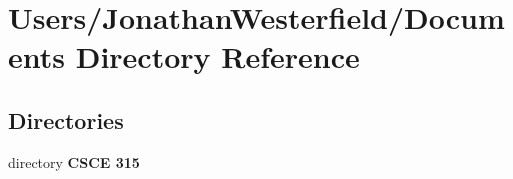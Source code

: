 \section{Users/\+Jonathan\+Westerfield/\+Documents Directory Reference}
\label{dir_e786fce247269efc49d01abc6dc65ade}
\subsection*{Directories}
\begin{DoxyCompactItemize}
\item 
directory {\bf C\+S\+C\+E 315}
\end{DoxyCompactItemize}
